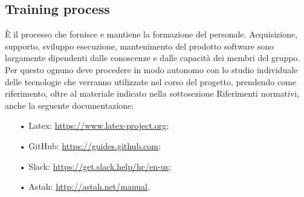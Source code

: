 \subsection{Training process}
È il processo che fornisce e mantiene la formazione del personale. Acquisizione, supporto, sviluppo esecuzione, mantenimento del prodotto software sono largamente dipendenti dalle conoscenze e dalle capacità dei membri del gruppo. 
\newline
Per questo ognuno deve procedere in modo autonomo con lo studio individuale delle tecnologie che verranno utilizzate nel corso del progetto, prendendo come riferimento, oltre al materiale indicato nella sottosezione Riferimenti normativi, anche la seguente documentazione:
\begin{itemize}
\item[•] Latex: \url{https://www.latex-project.org};
\item[•] GitHub: \url{https://guides.github.com};
\item[•] Slack: \url{https://get.slack.help/hc/en-us};
\item[•] Astah: \url{http://astah.net/manual}.
\end{itemize}